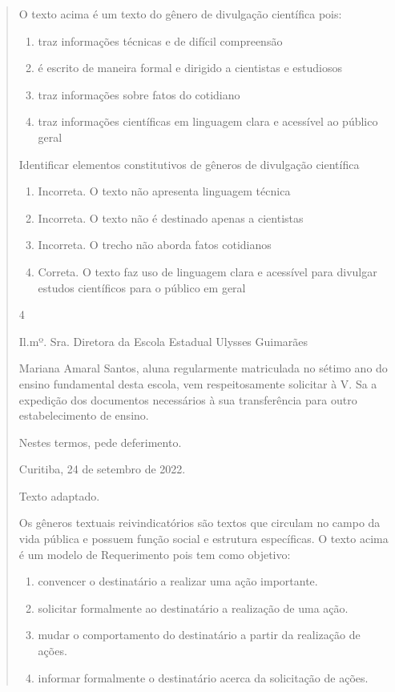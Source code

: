 {\begin{quote}
{\begin{itemize}
\begin{itemize}
O texto acima é um texto do gênero de divulgação científica pois:

\begin{enumerate}

\item
  traz informações técnicas e de difícil compreensão
\item
  é escrito de maneira formal e dirigido a cientistas e estudiosos
\item
  traz informações sobre fatos do cotidiano
\item
  traz informações científicas em linguagem clara e acessível ao público
  geral
\end{enumerate}

Identificar elementos constitutivos de gêneros de divulgação científica

\begin{enumerate}
\def\labelenumi{\arabic{enumi}.}
\item
  Incorreta. O texto não apresenta linguagem técnica
\item
  Incorreta. O texto não é destinado apenas a cientistas
\item
  Incorreta. O trecho não aborda fatos cotidianos
\item
  Correta. O texto faz uso de linguagem clara e acessível para divulgar
  estudos científicos para o público em geral
\end{enumerate}

\num{4}

Il.mº. Sra. Diretora da Escola Estadual Ulysses Guimarães

Mariana Amaral Santos, aluna regularmente matriculada no sétimo ano do
ensino fundamental desta escola, vem respeitosamente solicitar à V. Sa a
expedição dos documentos necessários à sua transferência para outro
estabelecimento de ensino.

Nestes termos, pede deferimento.

Curitiba, 24 de setembro de 2022.

Texto adaptado.

Os gêneros textuais reivindicatórios são textos que circulam no campo da
vida pública e possuem função social e estrutura específicas. O texto
acima é um modelo de Requerimento pois tem como objetivo:

\begin{enumerate}
\def\labelenumi{\arabic{enumi}.}
\item
  convencer o destinatário a realizar uma ação importante.
\item
  solicitar formalmente ao destinatário a realização de uma ação.
\item
  mudar o comportamento do destinatário a partir da realização de ações.
\item
  informar formalmente o destinatário acerca da solicitação de ações.
\end{enumerate}


\end{itemize}
\end{itemize}}
\end{quote}}
